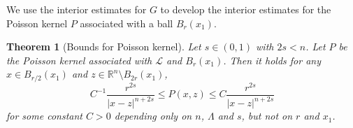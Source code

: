 \documentclass[11pt]{amsart}
\theoremstyle{plain}
\newtheorem{theorem}{Theorem}[section]
\theoremstyle{definition}
\numberwithin{equation}{section}
\begin{document}
    We use the interior estimates for $G$ to develop the interior estimates for the Poisson kernel $P$ associated with a ball $B_r(x_1)$.
    \begin{theorem}[Bounds for Poisson kernel]\label{thm-poissonest}
        Let $s \in (0, 1)$ with $2s<n$. Let $P$ be the Poisson kernel associated with $\mathcal{L}$ and $B_r(x_1)$. Then it holds for any $x \in B_{r/2}(x_1)$ and $z \in \mathbb{R}^n \setminus B_{2r}(x_1)$,
         \begin{equation*}
           C^{-1}\frac{r^{2s}}{|x-z|^{n+2s}} \leq P(x, z) \leq C\frac{r^{2s}}{|x-z|^{n+2s}}
         \end{equation*}
         for some constant $C>0$ depending only on $n$, $\Lambda$ and $s$, but not on $r$ and $x_1$. 
    \end{theorem}
\end{document}
